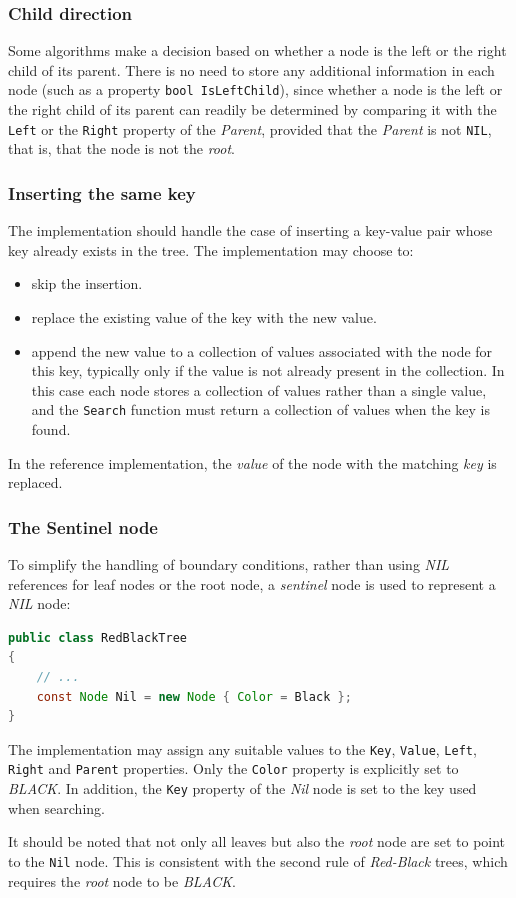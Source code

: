 \documentclass{article}
\begin{document}
\subsubsection{Child direction}

Some algorithms make a decision based on whether a node is the left or the right child of its parent.
There is no need to store any additional information in each node (such as a property \texttt{bool IsLeftChild}),
since whether a node is the left or the right child of its parent can readily be determined by comparing it with the
\texttt{Left} or the \texttt{Right} property of the \emph{Parent},
provided that the \emph{Parent} is not \texttt{NIL}, that is, that the node is not the \emph{root}.

\subsubsection{Inserting the same key}

The implementation should handle the case of inserting a key-value pair whose key already exists in the tree. The
implementation may choose to:
\begin{itemize}
    \item skip the insertion.
    \item replace the existing value of the key with the new value.
    \item append the new value to a collection of values associated with the node for this key, typically only if the
    value is not already present in the collection. In this case each node stores a collection of values rather than a
    single value, and the \texttt{Search} function must return a collection of values when the key is found.
\end{itemize}

In the reference implementation, the \emph{value} of the node with the matching \emph{key} is replaced.

\subsubsection{The Sentinel node}

To simplify the handling of boundary conditions, rather than using \emph{NIL} references for leaf nodes or the root
node, a \emph{sentinel} node is used to represent a \emph{NIL} node:
\begin{lstlisting}[language=java]
public class RedBlackTree
{
    // ...
    const Node Nil = new Node { Color = Black };
}
\end{lstlisting}
The implementation may assign any suitable values to the \texttt{Key}, \texttt{Value},
\texttt{Left}, \texttt{Right} and \texttt{Parent} properties. Only the \texttt{Color} property is explicitly set to
\emph{BLACK}. In addition, the \texttt{Key} property of the \emph{Nil} node is set to the key used when searching.
\par
It should be noted that not only all leaves but also the \emph{root} node are set to point to the \texttt{Nil} node.
This is consistent with the second rule of \emph{Red-Black} trees, which requires the \emph{root} node to be
\emph{BLACK}.
\par
\end{document}
